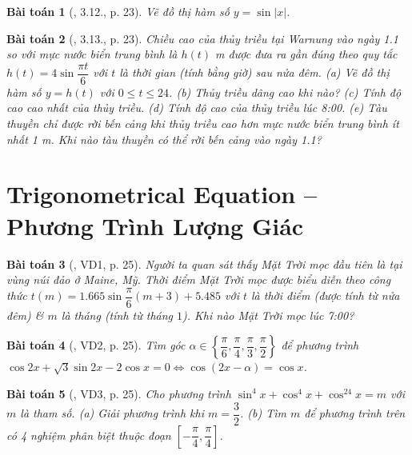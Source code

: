 \documentclass{article}
\newtheorem{baitoan}{Bài toán}
\begin{document}
\begin{baitoan}[\cite{Hung_nang_cao_phat_trien_Toan_11_tap_1}, 3.12., p. 23]
	Vẽ đồ thị hàm số $y = \sin|x|$.
\end{baitoan}

\begin{baitoan}[\cite{Hung_nang_cao_phat_trien_Toan_11_tap_1}, 3.13., p. 23]
	Chiều cao của thủy triều tại Warnung vào ngày {\rm1.1} so với mực nước biển trung bình là $h(t)$ {\rm m} được đưa ra gần đúng theo quy tắc $h(t) = 4\sin\dfrac{\pi t}{6}$ với $t$ là thời gian (tính bằng giờ) sau nửa đêm. (a) Vẽ đồ thị hàm số $y = h(t)$ với $0\le t\le24$. (b) Thủy triều dâng cao khi nào? (c) Tính độ cao cao nhất của thủy triều. (d) Tính độ cao của thủy triều lúc {\rm8:00}. (e) Tàu thuyền chỉ được rời bến cảng khi thủy triều cao hơn mực nước biển trung bình ít nhất {\rm1 m}. Khi nào tàu thuyền có thể rời bến cảng vào ngày {\rm1.1}?
\end{baitoan}


\section{Trigonometrical Equation -- Phương Trình Lượng Giác}

\begin{baitoan}[\cite{Hung_nang_cao_phat_trien_Toan_11_tap_1}, VD1, p. 25]
	Người ta quan sát thấy Mặt Trời mọc đầu tiên là tại vùng núi đảo ở Maine, Mỹ. Thời điểm Mặt Trời mọc được biểu diễn theo công thức $t(m) = 1.665\sin\dfrac{\pi}{6}(m + 3) + 5.485$ với $t$ là thời điểm (được tính từ nửa đêm) \& $m$ là tháng (tính từ tháng $1$). Khi nào Mặt Trời mọc lúc {\rm7:00}?
\end{baitoan}

\begin{baitoan}[\cite{Hung_nang_cao_phat_trien_Toan_11_tap_1}, VD2, p. 25]
	Tìm góc $\alpha\in\left\{\dfrac{\pi}{6},\dfrac{\pi}{4},\dfrac{\pi}{3},\dfrac{\pi}{2}\right\}$ để phương trình $\cos2x + \sqrt{3}\sin2x - 2\cos x = 0\Leftrightarrow\cos(2x - \alpha) = \cos x$.
\end{baitoan}

\begin{baitoan}[\cite{Hung_nang_cao_phat_trien_Toan_11_tap_1}, VD3, p. 25]
	Cho phương trình $\sin^4x + \cos^4x + \cos^24x = m$ với $m$ là tham số. (a) Giải phương trình khi $m = \dfrac{3}{2}$. (b) Tìm $m$ để phương trình trên có 4 nghiệm phân biệt thuộc đoạn $\left[-\dfrac{\pi}{4},\dfrac{\pi}{4}\right]$.
\end{baitoan}
\end{document}
